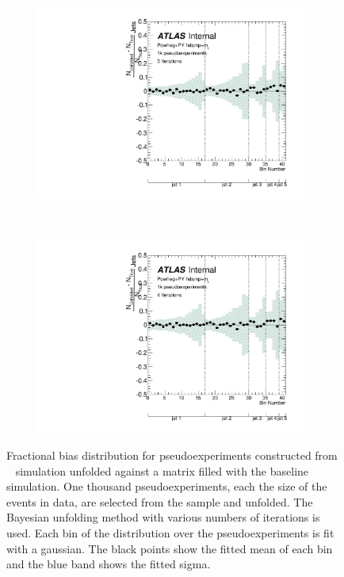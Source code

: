 \begin{figure}
\begin{subfigure}[]{0.5\textwidth}
\includegraphics[width=\textwidth]{fig/Stress/110404atlfast/FracBias3Iterations.pdf}
\end{subfigure}
~
\begin{subfigure}[]{0.5\textwidth}
\includegraphics[width=\textwidth]{fig/Stress/110404atlfast/FracBias4Iterations.pdf}
\end{subfigure}
\caption{Fractional bias distribution for pseudoexperiments constructed from \hdamp~ simulation unfolded against a matrix filled with the baseline simulation. One thousand pseudoexperiments, each the size of the events in data, are selected from the sample and unfolded. The Bayesian unfolding method with various numbers of iterations is used. Each bin of the distribution over the pseudoexperiments is fit with a gaussian. The black points show the fitted mean of each bin and the blue band shows the fitted sigma. }
\label{fig:hdampfrbias}
\end{figure}
